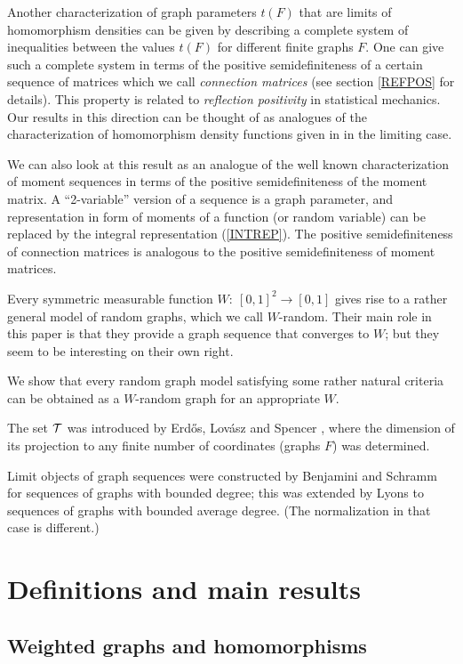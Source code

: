 \documentclass[fleqn]{article}
\begin{document}
Another characterization of graph parameters $t(F)$ that are limits
of homomorphism densities can be given by describing a complete
system of inequalities between the values $t(F)$ for different finite
graphs $F$. One can give such a complete system in terms of the
positive semidefiniteness of a certain sequence of matrices which we
call {\it connection matrices} (see section \ref{REFPOS} for
details). This property is related to {\it reflection positivity} in
statistical mechanics. Our results in this direction can be thought
of as analogues of the characterization of homomorphism density
functions given in \cite{FLS} in the limiting case.

We can also look at this result as an analogue of the well known
characterization of moment sequences in terms of the positive
semidefiniteness of the moment matrix. A ``2-variable'' version of a
sequence is a graph parameter, and representation in form of moments
of a function (or random variable) can be replaced by the integral
representation (\ref{INTREP}). The positive semidefiniteness of
connection matrices is analogous to the positive semidefiniteness of
moment matrices.

\medskip

Every symmetric measurable function $W:~[0,1]^2\to[0,1]$ gives rise
to a rather general model of random graphs, which we call $W$-random.
Their main role in this paper is that they provide a graph sequence
that converges to $W$; but they seem to be interesting on their own
right.

We show that every random graph model satisfying some rather natural
criteria can be obtained as a $W$-random graph for an appropriate
$W$.

\medskip

The set ${\cal T}$ was introduced by Erd\H{o}s, Lov\'asz and Spencer
\cite{ELS}, where the dimension of its projection to any finite
number of coordinates (graphs $F$) was determined.

Limit objects of graph sequences were constructed by Benjamini and
Schramm \cite{BS} for sequences of graphs with bounded degree;
this was extended by Lyons \cite{Ly} to sequences of graphs with
bounded average degree. (The normalization in that case is
different.)

\section{Definitions and main results}\label{RESULTS}

\subsection{Weighted graphs and homomorphisms}
\end{document}

